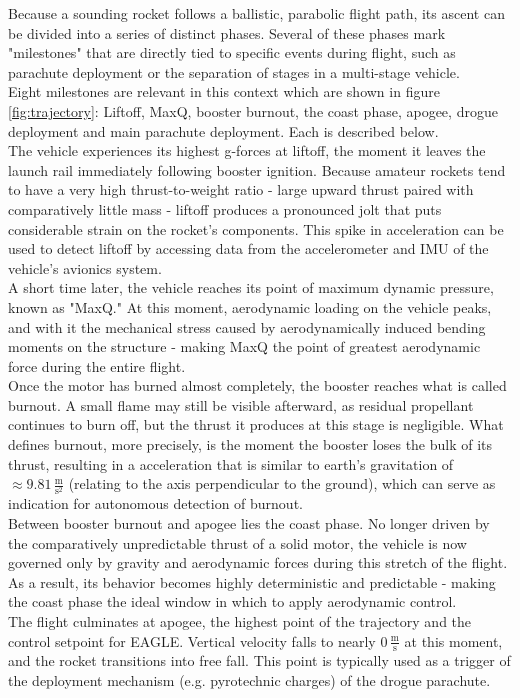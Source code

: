 \documentclass[fontsize=11pt,%
twoside,%
BCOR          = 8mm, %
DIV           = 11,  %
titlepage     = off,%
index=totoc,%
xcolor        = pdftex,%
dvipsnames,%
bibliography  = totoc,%
bibliography = numbered, %
listof        = notnumbered]{scrreprt}
\begin{document}
Because a sounding rocket follows a ballistic, parabolic flight path, its ascent can be divided into a series of distinct phases. Several of these phases mark "milestones" that are directly tied to specific events during flight, such as parachute deployment or the separation of stages in a multi-stage vehicle.\\
Eight milestones are relevant in this context which are shown in figure \ref{fig:trajectory}: Liftoff, MaxQ, booster burnout, the coast phase, apogee, drogue deployment and main parachute deployment. Each is described below.\\
The vehicle experiences its highest g-forces at liftoff, the moment it leaves the launch rail immediately following booster ignition. Because amateur rockets tend to have a very high thrust-to-weight ratio - large upward thrust paired with comparatively little mass - liftoff produces a pronounced jolt that puts considerable strain on the rocket's components. This spike in acceleration can be used to detect liftoff by accessing data from the accelerometer and IMU of the vehicle's avionics system.\\
A short time later, the vehicle reaches its point of maximum dynamic pressure, known as "MaxQ." At this moment, aerodynamic loading on the vehicle peaks, and with it the mechanical stress caused by aerodynamically induced bending moments on the structure - making MaxQ the point of greatest aerodynamic force during the entire flight.\\
Once the motor has burned almost completely, the booster reaches what is called burnout. A small flame may still be visible afterward, as residual propellant continues to burn off, but the thrust it produces at this stage is negligible. What defines burnout, more precisely, is the moment the booster loses the bulk of its thrust, resulting in a acceleration that is similar to earth's gravitation of $\approx9.81\,\frac{\text{m}}{\text{s}^2}$ (relating to the axis perpendicular to the ground), which can serve as indication for autonomous detection of burnout.\\
Between booster burnout and apogee lies the coast phase. No longer driven by the comparatively unpredictable thrust of a solid motor, the vehicle is now governed only by gravity and aerodynamic forces during this stretch of the flight. As a result, its behavior becomes highly deterministic and predictable - making the coast phase the ideal window in which to apply aerodynamic control.\\
The flight culminates at apogee, the highest point of the trajectory and the control setpoint for EAGLE. Vertical velocity falls to nearly $0\,\frac{\text{m}}{\text{s}}$ at this moment, and the rocket transitions into free fall. This point is typically used as a trigger of the deployment mechanism (e.g. pyrotechnic charges) of the drogue parachute.\\
\end{document}
